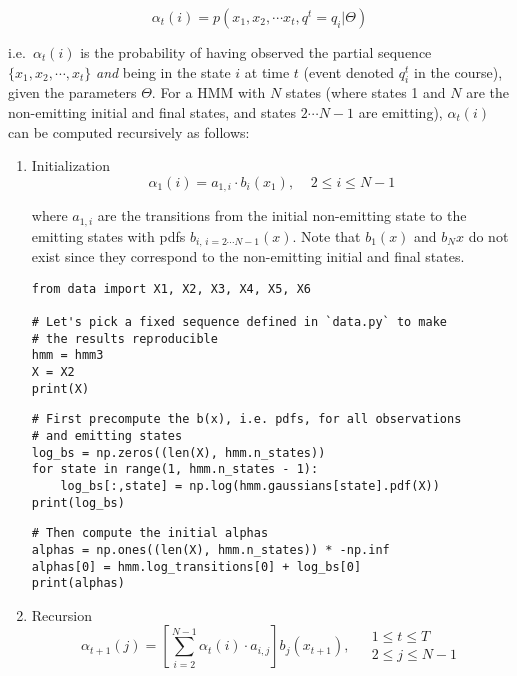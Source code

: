 \documentclass[11pt]{article}
\begin{document}
$$
    \alpha_t(i) = p(x_1,x_2,\cdots x_t,q^t=q_i|\Theta)
$$

\noindent
i.e. \(\alpha_t(i)\) is the probability of having observed the partial
sequence \(\{x_1,x_2,\cdots,x_t\}\) \emph{and} being in the state \(i\) at time
\(t\) (event denoted \(q_i^t\) in the course), given the parameters
\(\Theta\). For a HMM with \(N\) states (where states 1 and \(N\) are the
non-emitting initial and final states, and states \(2 \cdots N-1\) are
emitting), \(\alpha_t(i)\) can be computed recursively as follows:

\begin{enumerate}
\item Initialization
\label{sec:org6a0ef38}
$$
        \alpha_1(i) = a_{1,i} \cdot b_i(x_1), \;\;\;\; 2 \leq i \leq N-1
$$

where \(a_{1,i}\) are the transitions from the initial non-emitting state
to the emitting states with pdfs \(b_{i,\,i = 2 \cdots N-1}(x)\). Note
that \(b_1(x)\) and \(b_N{x}\) do not exist since they correspond to the
non-emitting initial and final states.

\begin{verbatim}
from data import X1, X2, X3, X4, X5, X6

# Let's pick a fixed sequence defined in `data.py` to make
# the results reproducible
hmm = hmm3
X = X2
print(X)
\end{verbatim}

\begin{verbatim}
# First precompute the b(x), i.e. pdfs, for all observations
# and emitting states
log_bs = np.zeros((len(X), hmm.n_states))
for state in range(1, hmm.n_states - 1):
    log_bs[:,state] = np.log(hmm.gaussians[state].pdf(X))
print(log_bs)
\end{verbatim}

\begin{verbatim}
# Then compute the initial alphas
alphas = np.ones((len(X), hmm.n_states)) * -np.inf
alphas[0] = hmm.log_transitions[0] + log_bs[0]
print(alphas)
\end{verbatim}

\item Recursion
\label{sec:org57e6879}
$$
        \alpha_{t+1}(j) = \left[ \sum_{i=2}^{N-1} \alpha_{t}(i) \cdot a_{i,j} \right] b_j(x_{t+1}),
        \;\;\;\; \begin{array}{l} 1 \leq t \leq T \\ 2 \leq j \leq N-1 \end{array}
$$


\end{enumerate}
\end{document}
